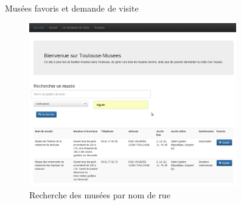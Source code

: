 \begin{frame}{Musées favoris et demande de visite}
\begin{figure}
		 { 
		\includegraphics[width=9cm]{screens/search_by_address.png}
		\caption{Recherche des musées par nom de rue}
		}
		
		
		
	\end{figure}
\end{frame}